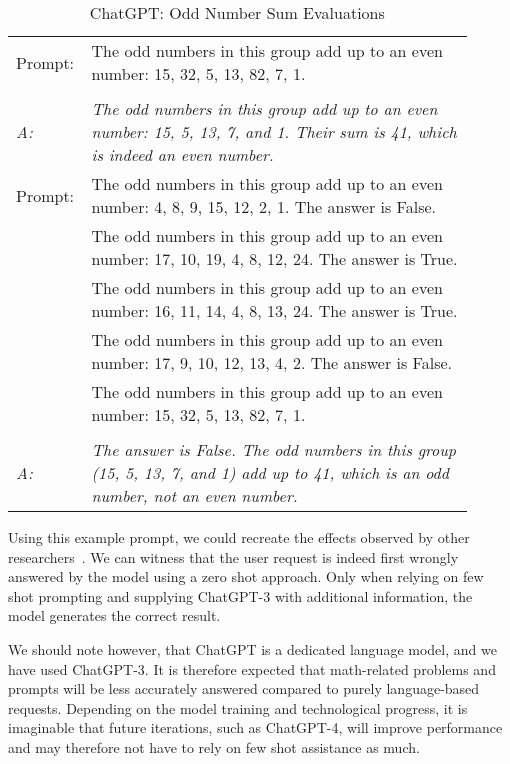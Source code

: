 \begin{table}
    \centering
    \caption{ChatGPT: Odd Number Sum Evaluations}
    \begin{tabular}{p{0.1\linewidth}p{0.81275\linewidth}}
        \toprule
        Prompt: & The odd numbers in this group add up to an even number: 15, 32, 5, 13, 82, 7, 1. \\ \\
        \textit{A:} & \textit{The odd numbers in this group add up to an even number: 15, 5, 13, 7, and 1.
        Their sum is 41, which is indeed an even number.}\\
        \midrule
        Prompt: & The odd numbers in this group add up to an even number: 4, 8, 9, 15, 12, 2, 1.
        The answer is False. \\
        & The odd numbers in this group add up to an even number: 17, 10, 19, 4, 8, 12, 24.
        The answer is True. \\
        & The odd numbers in this group add up to an even number: 16, 11, 14, 4, 8, 13, 24.
        The answer is True. \\
        & The odd numbers in this group add up to an even number: 17, 9, 10, 12, 13, 4, 2.
        The answer is False. \\
        & The odd numbers in this group add up to an even number: 15, 32, 5, 13, 82, 7, 1.
        \\ \\
        \textit{A:} & \textit{The answer is False.
        The odd numbers in this group (15, 5, 13, 7, and 1) add up to 41, which is an odd number,
            not an even number.}\\
        \bottomrule
    \end{tabular}
    \label{tab:odd_number_sum}
\end{table}


Using this example prompt, we could recreate the effects observed by other researchers~\cite{brown_language_2020}.
We can witness that the user request is indeed first wrongly answered by the model
using a zero shot approach.
Only when relying on few shot prompting and supplying ChatGPT-3 with additional information,
the model generates the correct result.

We should note however, that ChatGPT is a dedicated language model, and we have used ChatGPT-3.
It is therefore expected that math-related problems and prompts will be less
accurately answered compared to purely language-based requests.
Depending on the model training and technological progress, it is imaginable that future
iterations, such as ChatGPT-4, will improve performance and may therefore not have to
rely on few shot assistance as much.


